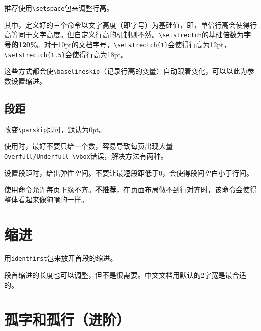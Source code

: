 \documentclass[10pt,openany]{book}
\begin{document}
推荐使用\texttt{\textbackslash{}setspace}包来调整行高。



其中，定义好的三个命令以文字高度（即字号）为基础值，即，单倍行高会使得行高等同于文字高度。但自定义行高的机制则不然。\texttt{\textbackslash{}setstrectch}的基础倍数为\textbf{字号的120\%}。对于10pt的文档字号，\texttt{\textbackslash{}setstrectch\{1\}}会使得行高为12pt，\texttt{\textbackslash{}setstrectch\{1.5\}}会使得行高为18pt。

这些方式都会使\texttt{\textbackslash{}baselineskip}（记录行高的变量）自动跟着变化，可以以此为参数设置缩进。

\subsection{段距}

改变\texttt{\textbackslash{}parskip}即可，默认为0pt。



使用时，最好不要只给一个数，容易导致每页出现大量\texttt{Overfull/Underfull\ \textbackslash{}vbox}错误，解决方法有两种。

\begin{tightenum}
    \item   设置段距时，给出弹性空间。不要让最短段距低于0，会使得段间空白小于行间。
    \item   使用命令允许每页下缘不齐。\textbf{不推荐}，在页面布局做不到行对齐时，该命令会使得整体看起来像狗啃的一样。
\end{tightenum}



\section{缩进}

用\texttt{identfirst}包来放开首段的缩进。



段首缩进的长度也可以调整，但不是很需要。中文文档用默认的2字宽是最合适的。



\section{孤字和孤行（进阶）}
\end{document}
